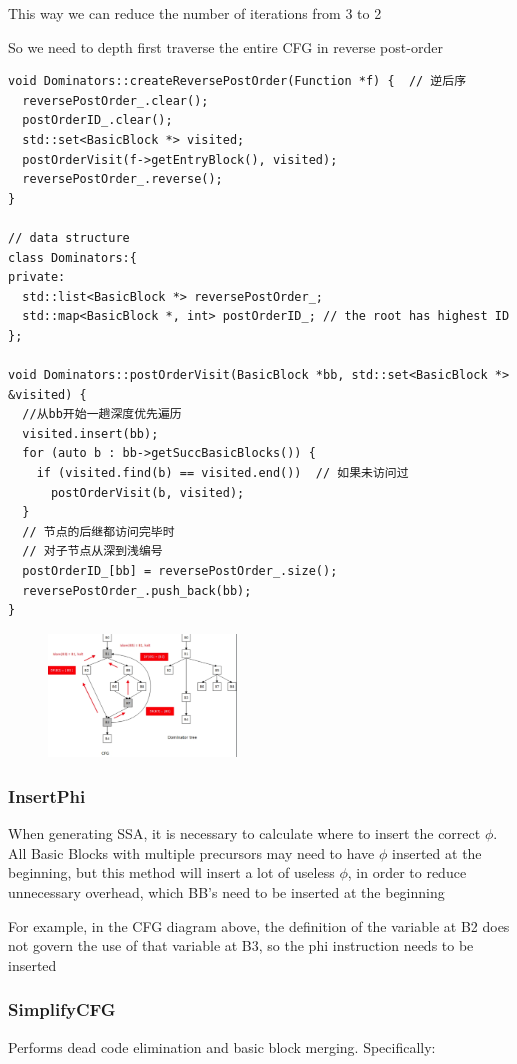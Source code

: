 \documentclass[a4paper]{exam}
\theoremstyle{definition}
\begin{document}
\begin{enumerate}
This way we can reduce the number of iterations from 3 to 2

So we need to depth first traverse the entire CFG in reverse post-order \cite{cooper2001simple}
\begin{verbatim}
void Dominators::createReversePostOrder(Function *f) {  // 逆后序
  reversePostOrder_.clear();
  postOrderID_.clear();
  std::set<BasicBlock *> visited;
  postOrderVisit(f->getEntryBlock(), visited);
  reversePostOrder_.reverse();
}

// data structure
class Dominators:{
private:
  std::list<BasicBlock *> reversePostOrder_;
  std::map<BasicBlock *, int> postOrderID_; // the root has highest ID
};

void Dominators::postOrderVisit(BasicBlock *bb, std::set<BasicBlock *> &visited) {
  //从bb开始一趟深度优先遍历
  visited.insert(bb);
  for (auto b : bb->getSuccBasicBlocks()) {
    if (visited.find(b) == visited.end())  // 如果未访问过
      postOrderVisit(b, visited);
  }
  // 节点的后继都访问完毕时
  // 对子节点从深到浅编号
  postOrderID_[bb] = reversePostOrder_.size();
  reversePostOrder_.push_back(bb);
}
\end{verbatim}
\begin{figure}[htbp]
  \centering
  \includegraphics[width=5cm]{./img/figure2.png}
\end{figure}
\end{enumerate}
\subsubsection{InsertPhi}
When generating SSA, it is necessary to calculate where to insert the correct $\phi$. All Basic Blocks with multiple precursors may need to have $\phi$ inserted at the beginning, but this method will insert a lot of useless $\phi$, in order to reduce unnecessary overhead, which BB's need to be inserted at the beginning

For example, in the CFG diagram above, the definition of the variable at B2 does not govern the use of that variable at B3, so the phi instruction needs to be inserted


\subsubsection{SimplifyCFG}
Performs dead code elimination and basic block merging. Specifically:
\end{document}
